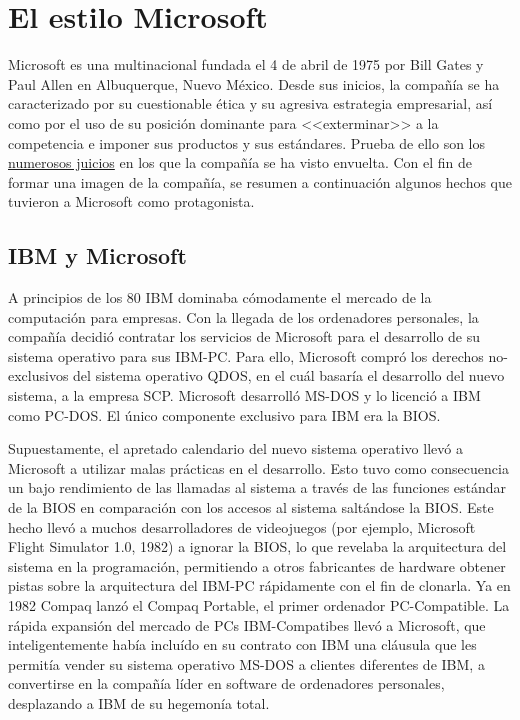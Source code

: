 \section{El estilo Microsoft}
Microsoft es una multinacional fundada el 4 de abril de 1975 por Bill Gates y Paul Allen en Albuquerque, Nuevo México. Desde sus inicios, la compañía se ha caracterizado por su cuestionable ética y su agresiva estrategia empresarial, así como por el uso de su posición dominante para <<exterminar>> a la competencia e imponer sus productos y sus estándares. Prueba de ello son los \href{https://en.wikipedia.org/wiki/Microsoft_litigation}{numerosos juicios} en los que la compañía se ha visto envuelta\cite{wiki_2020:microsoft_litigation}. Con el fin de formar una imagen de la compañía, se resumen a continuación algunos hechos que tuvieron a Microsoft como protagonista.

\subsection{IBM y Microsoft}
A principios de los 80 IBM dominaba cómodamente el mercado de la computación para empresas. Con la llegada de los ordenadores personales, la compañía decidió contratar los servicios de Microsoft para el desarrollo de su sistema operativo para sus IBM-PC. Para ello, Microsoft compró los derechos no-exclusivos del sistema operativo QDOS, en el cuál basaría el desarrollo del nuevo sistema, a la empresa SCP. Microsoft desarrolló MS-DOS y lo licenció a IBM como PC-DOS. El único componente exclusivo para IBM era la BIOS.\cite{tdith_deal_with_devil_2019}\cite{tdith_rights_to_86DOS:2019}

Supuestamente, el apretado calendario del nuevo sistema operativo llevó a Microsoft a utilizar malas prácticas en el desarrollo. Esto tuvo como consecuencia un bajo rendimiento de las llamadas al sistema a través de las funciones estándar de la BIOS en comparación con los accesos al sistema saltándose la BIOS. Este hecho llevó a muchos desarrolladores de videojuegos (por ejemplo, Microsoft Flight Simulator 1.0, 1982) a ignorar la BIOS, lo que revelaba la arquitectura del sistema en la programación, permitiendo a otros fabricantes de hardware obtener pistas sobre la arquitectura del IBM-PC rápidamente con el fin de clonarla. Ya en 1982 Compaq lanzó el Compaq Portable, el primer ordenador PC-Compatible. La rápida expansión del mercado de PCs IBM-Compatibes llevó a Microsoft, que inteligentemente había incluído en su contrato con IBM una cláusula que les permitía vender su sistema operativo MS-DOS a clientes diferentes de IBM, a convertirse en la compañía líder en software de ordenadores personales, desplazando a IBM de su hegemonía total.\cite{wiki:ibm-pc-compatible-origins}

